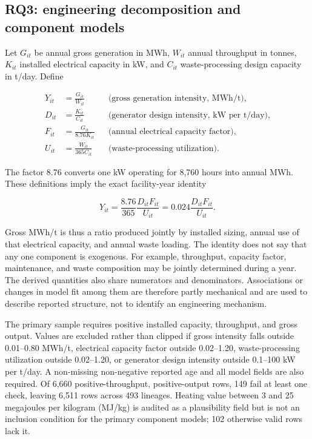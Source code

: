 \documentclass[11pt,letterpaper]{article}
\begin{document}
\subsection{RQ3: engineering decomposition and component models}

Let $G_{it}$ be annual gross generation in MWh, $W_{it}$ annual throughput in
tonnes, $K_{it}$ installed electrical capacity in kW, and $C_{it}$
waste-processing design capacity in t/day. Define

\begin{align}
Y_{it}&=\frac{G_{it}}{W_{it}}
&&\text{(gross generation intensity, MWh/t)},
\label{eq:gross-intensity}\\
D_{it}&=\frac{K_{it}}{C_{it}}
&&\text{(generator design intensity, kW per t/day)},
\label{eq:design-intensity}\\
F_{it}&=\frac{G_{it}}{8.76K_{it}}
&&\text{(annual electrical capacity factor)},
\label{eq:capacity-factor}\\
U_{it}&=\frac{W_{it}}{365C_{it}}
&&\text{(waste-processing utilization)}.
\label{eq:waste-utilization}
\end{align}

The factor 8.76 converts one kW operating for 8,760 hours into annual MWh. These
definitions imply the exact facility-year identity

\begin{equation}
Y_{it}=\frac{8.76}{365}\frac{D_{it}F_{it}}{U_{it}}
=0.024\frac{D_{it}F_{it}}{U_{it}}.
\label{eq:engineering-identity}
\end{equation}

Gross MWh/t is thus a ratio produced jointly by installed sizing, annual use of
that electrical capacity, and annual waste loading. The identity does not say
that any one component is exogenous. For example, throughput, capacity factor,
maintenance, and waste composition may be jointly determined during a year.
The derived quantities also share numerators and denominators. Associations or
changes in model fit among them are therefore partly mechanical and are used to
describe reported structure, not to identify an engineering mechanism.

The primary sample requires positive installed capacity, throughput, and gross
output. Values are excluded rather than clipped if gross intensity falls
outside 0.01--0.80 MWh/t, electrical capacity factor outside 0.02--1.20,
waste-processing utilization outside 0.02--1.20, or generator design intensity
outside 0.1--100 kW per t/day. A non-missing non-negative reported age and all
model fields are also required. Of 6,660 positive-throughput, positive-output
rows, 149 fail at least one check, leaving 6,511 rows across 493 lineages.
Heating value between 3 and 25 megajoules per kilogram (MJ/kg) is audited as a
plausibility field but is not an inclusion condition for the primary component
models; 102 otherwise valid rows lack it.
\end{document}
